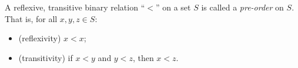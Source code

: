 A reflexive, transitive binary relation ``$<$'' on a set $S$ is called a \emph{pre-order} on $S$. That is, for all $x, y, z \in S$:
\begin{itemize}
\item (reflexivity) $x < x$;
\item (transitivity) if $x < y$ and $y < z$, then $x < z$.
\end{itemize}
